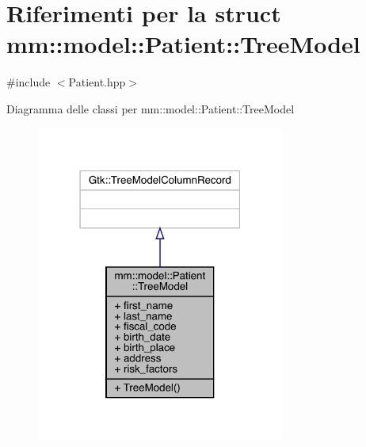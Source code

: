 \hypertarget{structmm_1_1model_1_1_patient_1_1_tree_model}{}\section{Riferimenti per la struct mm\+:\+:model\+:\+:Patient\+:\+:Tree\+Model}
\label{structmm_1_1model_1_1_patient_1_1_tree_model}


{\ttfamily \#include $<$Patient.\+hpp$>$}



Diagramma delle classi per mm\+:\+:model\+:\+:Patient\+:\+:Tree\+Model
\nopagebreak
\begin{figure}[H]
\begin{center}
\leavevmode
\includegraphics[width=231pt]{db/d2c/structmm_1_1model_1_1_patient_1_1_tree_model__inherit__graph}
\end{center}
\end{figure}


